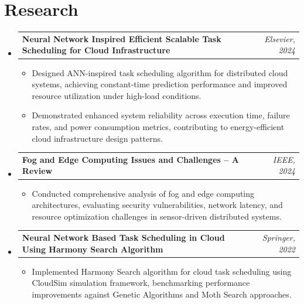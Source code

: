 \documentclass[letterpaper,11pt]{article}
\makeatletter
\newcommand{\resumeProjectHeading}[2]{
  \vspace{0pt}\item
    \begin{tabular*}{\textwidth}{l@{\extracolsep{\fill}}r}
      \textbf{#1}{ $|\$ \textit{#2}} & \\
    \end{tabular*}\vspace{-6pt}
}
\newcommand{\resumeResearchHeading}[2]{
  \vspace{0pt}\item
    \begin{tabular*}{\textwidth}{l@{\extracolsep{\fill}}r}
      \textbf{#1} & \textit{#2} \\
    \end{tabular*}\vspace{-6pt}
}
\newcommand{\resumeSubHeadingListStart}{\begin{itemize}[leftmargin=0pt,label={},itemsep=-2pt]}
\newcommand{\resumeSubHeadingListEnd}{\end{itemize}}
\newcommand{\resumeItemListStart}{\begin{itemize}[leftmargin=12pt, nosep, topsep=2pt]}
\newcommand{\resumeItemListEnd}{\end{itemize}}
\renewcommand{\resumeProjectHeading}[2]{
  \vspace{0pt}\item
    \begin{tabular*}{\textwidth}{l@{\extracolsep{\fill}}r}
      \textbf{#1}{ $|$ \parbox[t]{0.82\textwidth}{\textit{#2}}} & \\
    \end{tabular*}\vspace{-6pt}
}
\makeatother
\begin{document}



\section{Research}
  \resumeSubHeadingListStart
    \resumeResearchHeading
      {Neural Network Inspired Efficient Scalable Task Scheduling for Cloud Infrastructure}{Elsevier, 2024}
      \resumeItemListStart
        \item {Designed ANN-inspired task scheduling algorithm for distributed cloud systems, achieving constant-time prediction performance and improved resource utilization under high-load conditions.}
        \item {Demonstrated enhanced system reliability across execution time, failure rates, and power consumption metrics, contributing to energy-efficient cloud infrastructure design patterns.}
      \resumeItemListEnd

    \resumeResearchHeading
      {Fog and Edge Computing Issues and Challenges -- A Review}{IEEE, 2024}
      \resumeItemListStart
        \item {Conducted comprehensive analysis of fog and edge computing architectures, evaluating security vulnerabilities, network latency, and resource optimization challenges in sensor-driven distributed systems.}
      \resumeItemListEnd

    \resumeResearchHeading
      {Neural Network Based Task Scheduling in Cloud Using Harmony Search Algorithm}{Springer, 2022}
      \resumeItemListStart
        \item {Implemented Harmony Search algorithm for cloud task scheduling using CloudSim simulation framework, benchmarking performance improvements against Genetic Algorithms and Moth Search approaches.}
      \resumeItemListEnd
  \resumeSubHeadingListEnd
\end{document}
